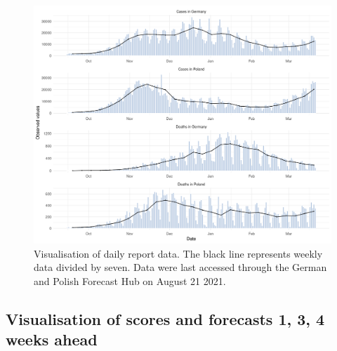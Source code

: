 \documentclass[
]{article}
\begin{document}
\begin{figure}[H]
\includegraphics[width=1\linewidth,]{../analysis/plots/daily_truth} \caption{Visualisation of daily report data. The black line represents weekly data divided by seven. Data were last accessed through the German and Polish Forecast Hub on August 21 2021.}\label{fig:daily-truth}
\end{figure}

\clearpage

\hypertarget{visualisation-of-scores-and-forecasts-1-3-4-weeks-ahead}{%
\subsection{Visualisation of scores and forecasts 1, 3, 4 weeks ahead}\label{visualisation-of-scores-and-forecasts-1-3-4-weeks-ahead}}
\end{document}
